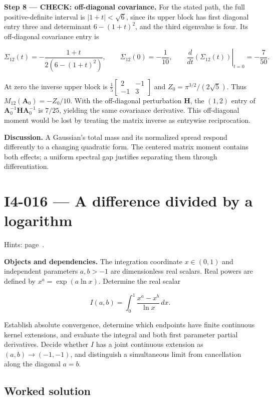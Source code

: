 \documentclass[11pt,oneside,openany]{book}
\begin{document}
\textbf{Step 8 --- CHECK: off-diagonal covariance.} For the stated path, the full positive-definite interval is \(|1+t|<\sqrt6\), since its upper block has first diagonal entry three and determinant \(6-(1+t)^2\), and the third eigenvalue is four. Its off-diagonal covariance entry is

\[
\Sigma_{12}(t)=-\frac{1+t}{2(6-(1+t)^2)},
\qquad
\Sigma_{12}(0)=-\frac1{10},
\qquad
\left.\frac{d}{dt}(\Sigma_{12}(t))\right|_{t=0}=-\frac7{50}.
\]

At zero the inverse upper block is \(\frac15\begin{bmatrix}2&-1\\-1&3\end{bmatrix}\) and \(Z_0=\pi^{3/2}/(2\sqrt5)\). Thus \(M_{12}(\mathbf A_0)=-Z_0/10\). With the off-diagonal perturbation \(\mathbf H\), the \((1,2)\) entry of \(\mathbf A_0^{-1}\mathbf H\mathbf A_0^{-1}\) is \(7/25\), yielding the same covariance derivative. This off-diagonal moment would be lost by treating the matrix inverse as entrywise reciprocation.

\textbf{Discussion.} A Gaussian's total mass and its normalized spread respond differently to a changing quadratic form. The centered matrix moment contains both effects; a uniform spectral gap justifies separating them through differentiation.
\clearpage
\section{I4-016 --- A difference divided by a logarithm}
\label{problem:I4-016}
{\small Hints: page~\pageref{hints:I4-016}.}\par\medskip

\textbf{Objects and dependencies.} The integration coordinate \(x\in(0,1)\) and independent parameters \(a,b>-1\) are dimensionless real scalars. Real powers are defined by \(x^a=\exp(a\ln x)\). Determine the real scalar

\[
I(a,b)=\int_0^1\frac{x^a-x^b}{\ln x}\,dx.
\]

Establish absolute convergence, determine which endpoints have finite continuous kernel extensions, and evaluate the integral and both first parameter partial derivatives. Decide whether \(I\) has a joint continuous extension as \((a,b)\to(-1,-1)\), and distinguish a simultaneous limit from cancellation along the diagonal \(a=b\).
\subsection*{Worked solution}
\end{document}
